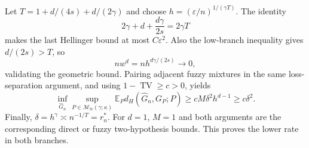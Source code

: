 Let \(T=1+d/(4s)+d/(2\gamma)\) and choose \(h=(\varepsilon/n)^{1/(\gamma T)}\). The identity
\[
2\gamma+d+\frac{d\gamma}{2s}=2\gamma T
\]
makes the last Hellinger bound at most \(C\varepsilon^2\). Also the low-branch inequality gives \(d/(2s)>T\), so
\[
nw^d=n h^{d\gamma/(2s)}\longrightarrow0,
\]
validating the geometric bound. Pairing adjacent fuzzy mixtures in the same loss-separation argument, and using \(1-\operatorname{TV}\ge c>0\), yields
\[
\inf_{\widehat G_n}\sup_{P\in\mathcal M_{\mathrm{tr}}(\gamma;\kappa)}
\mathbb E_P d_H(\widehat G_n,G_P;P)
\ge cM\delta^2h^{d-1}\ge c\delta^2.
\]
Finally, \(\delta=h^\gamma\asymp n^{-1/T}=r_n^*\). For \(d=1\), \(M=1\) and both arguments are the corresponding direct or fuzzy two-hypothesis bounds. This proves the lower rate in both branches.